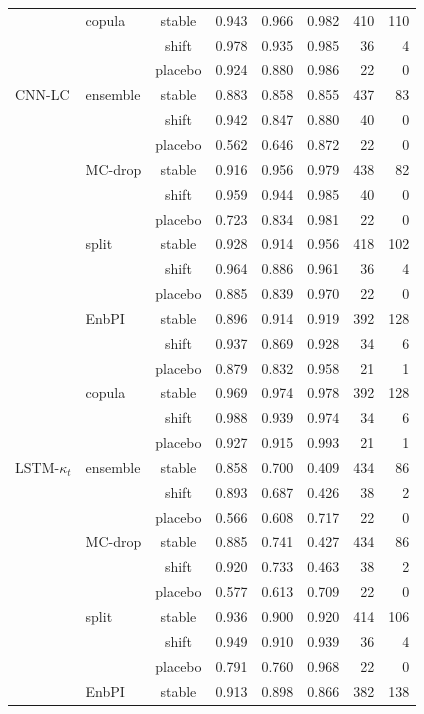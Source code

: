 {\begin{longtable}{@{}llcrrrrr@{}}
 & copula & stable & 0.943 & 0.966 & 0.982 & 410 & 110 \\
 &  & shift & 0.978 & 0.935 & 0.985 & 36 & 4 \\
 &  & placebo & 0.924 & 0.880 & 0.986 & 22 & 0 \\
\addlinespace[2pt]
CNN-LC & ensemble & stable & 0.883 & 0.858 & 0.855 & 437 & 83 \\
 &  & shift & 0.942 & 0.847 & 0.880 & 40 & 0 \\
 &  & placebo & 0.562 & 0.646 & 0.872 & 22 & 0 \\
 & MC-drop & stable & 0.916 & 0.956 & 0.979 & 438 & 82 \\
 &  & shift & 0.959 & 0.944 & 0.985 & 40 & 0 \\
 &  & placebo & 0.723 & 0.834 & 0.981 & 22 & 0 \\
 & split & stable & 0.928 & 0.914 & 0.956 & 418 & 102 \\
 &  & shift & 0.964 & 0.886 & 0.961 & 36 & 4 \\
 &  & placebo & 0.885 & 0.839 & 0.970 & 22 & 0 \\
 & EnbPI & stable & 0.896 & 0.914 & 0.919 & 392 & 128 \\
 &  & shift & 0.937 & 0.869 & 0.928 & 34 & 6 \\
 &  & placebo & 0.879 & 0.832 & 0.958 & 21 & 1 \\
 & copula & stable & 0.969 & 0.974 & 0.978 & 392 & 128 \\
 &  & shift & 0.988 & 0.939 & 0.974 & 34 & 6 \\
 &  & placebo & 0.927 & 0.915 & 0.993 & 21 & 1 \\
\addlinespace[2pt]
LSTM-$\kappa_t$ & ensemble & stable & 0.858 & 0.700 & 0.409 & 434 & 86 \\
 &  & shift & 0.893 & 0.687 & 0.426 & 38 & 2 \\
 &  & placebo & 0.566 & 0.608 & 0.717 & 22 & 0 \\
 & MC-drop & stable & 0.885 & 0.741 & 0.427 & 434 & 86 \\
 &  & shift & 0.920 & 0.733 & 0.463 & 38 & 2 \\
 &  & placebo & 0.577 & 0.613 & 0.709 & 22 & 0 \\
 & split & stable & 0.936 & 0.900 & 0.920 & 414 & 106 \\
 &  & shift & 0.949 & 0.910 & 0.939 & 36 & 4 \\
 &  & placebo & 0.791 & 0.760 & 0.968 & 22 & 0 \\
 & EnbPI & stable & 0.913 & 0.898 & 0.866 & 382 & 138 \\

\end{longtable}}
